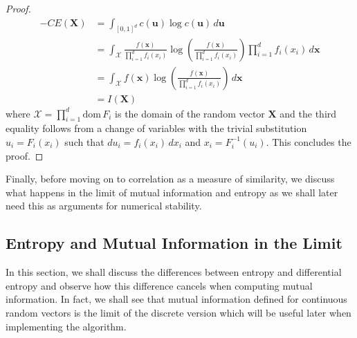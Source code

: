 \documentclass[../Thesis.tex]{subfiles}
\begin{document}
\begin{proof}
    \begin{align*}
        -CE\left(\boldsymbol{X}\right) & = \int_{[0,1]^d} c\left(\boldsymbol{u}\right) \log c\left(\boldsymbol{u}\right) \, d\boldsymbol{u}                                                                                                                        \\
                                       & =  \int_{\mathcal{X}} \frac{f(\boldsymbol{x})}{\prod_{i=1}^{d} f_i\left(x_i\right)} \log\left(\frac{f(\boldsymbol{x})}{\prod_{i=1}^{d} f_i\left(x_i\right)}\right) \prod_{i=1}^{d} f_i\left(x_i\right) \, d\boldsymbol{x} \\
                                       & = \int_{\mathcal{X}} f(\boldsymbol{x}) \log\left(\frac{f(\boldsymbol{x})}{\prod_{i=1}^{d} f_i\left(x_i\right)}\right) \, d\boldsymbol{x}                                                                                  \\
                                       & = I\left(\boldsymbol{X}\right)
    \end{align*}
    where $\mathcal{X}  = \prod_{i = 1}^{d} \text{dom}\, F_i $ is the domain of the random vector $\boldsymbol X$ and the third equality follows from a change of variables with the trivial substitution $u_i = F_i(x_i)$ such that $du_i = f_i(x_i)\,dx_i$ and $x_i = F_i^{-1}\left(u_i\right)$. This concludes the proof.
\end{proof}
Finally, before moving on to correlation as a measure of similarity, we discuss what happens in the limit of mutual information and entropy as we shall later need this as arguments for numerical stability.


\subsection{Entropy and Mutual Information in the Limit}\label{subsec:limit entropy and MI}
In this section, we shall discuss the differences between entropy and differential entropy and observe how this difference cancels when computing mutual information. In fact, we shall see that mutual information defined for continuous random vectors is the limit of the discrete version which will be useful later when implementing the algorithm.
\end{document}
